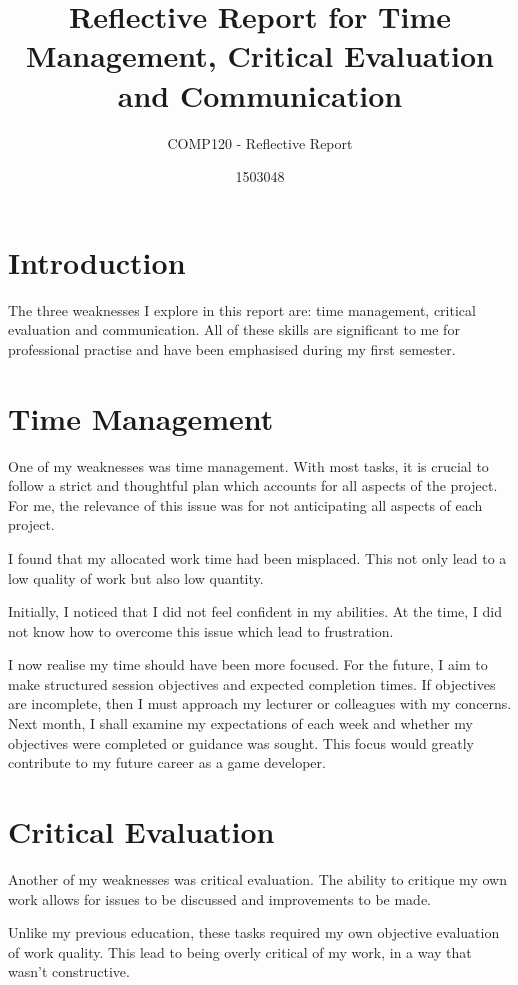 \documentclass{scrartcl}
\title{Reflective Report for Time Management, Critical Evaluation and Communication}
\subtitle{COMP120 - Reflective Report}
\author{1503048}
\begin{document}
\maketitle

\section{Introduction}

The three weaknesses I explore in this report are: time management, critical evaluation and communication. All of these skills are significant to me for professional practise and have been emphasised during my first semester.

\section{Time Management}

One of my weaknesses was time management. With most tasks, it is crucial to follow a strict and thoughtful plan which accounts for all aspects of the project. For me, the relevance of this issue was for not anticipating all aspects of each project.

I found that my allocated work time had been misplaced. This not only lead to a low quality of work but also low quantity.

Initially, I noticed that I did not feel confident in my abilities. At the time, I did not know how to overcome this issue which lead to frustration.

I now realise my time should have been more focused. For the future, I aim to make structured session objectives and expected completion times. If objectives are incomplete, then I must approach my lecturer or colleagues with my concerns. Next month, I shall examine my expectations of each week and whether my objectives were completed or guidance was sought. This focus would greatly contribute to my future career as a game developer.

\section{Critical Evaluation}

Another of my weaknesses was critical evaluation. The ability to critique my own work allows for issues to be discussed and improvements to be made.

Unlike my previous education, these tasks required my own objective evaluation of work quality. This lead to being overly critical of my work, in a way that wasn't constructive.
\end{document}
